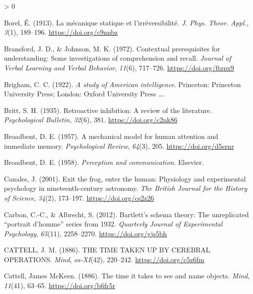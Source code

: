 \documentclass[
  oneside,
  12pt]{crumpbook}
\newlength{\cslhangindent}
\newenvironment{CSLReferences}[2] %
 {%
  \setlength{\parindent}{0pt}
  \ifodd #1 \everypar{\setlength{\hangindent}{\cslhangindent}}\ignorespaces\fi
  \ifnum #2 > 0
  \setlength{\parskip}{#2\baselineskip}
  \fi
 }%
 {}
\begin{document}
\begin{CSLReferences}{1}{0}
\leavevmode\hypertarget{ref-borelMecaniqueStatiqueIrreversibilite1913}{}%
Borel, É. (1913). La mécanique statique et l'irréversibilité. \emph{J. Phys. Theor. Appl.}, \emph{3}(1), 189--196. \url{https://doi.org/c9nnbz}

\leavevmode\hypertarget{ref-bransfordContextualPrerequisitesUnderstanding1972}{}%
Bransford, J. D., \& Johnson, M. K. (1972). Contextual prerequisites for understanding: {Some} investigations of comprehension and recall. \emph{Journal of Verbal Learning and Verbal Behavior}, \emph{11}(6), 717--726. \url{https://doi.org/ftzpx9}

\leavevmode\hypertarget{ref-brighamStudyAmericanIntelligence1922}{}%
Brigham, C. C. (1922). \emph{A study of {American} intelligence}. {Princeton: Princeton University Press; London: Oxford University Press \ldots{}}.

\leavevmode\hypertarget{ref-brittRetroactiveInhibitionReview1935}{}%
Britt, S. H. (1935). Retroactive inhibition: A review of the literature. \emph{Psychological Bulletin}, \emph{32}(6), 381. \url{https://doi.org/c2nk86}

\leavevmode\hypertarget{ref-broadbentMechanicalModelHuman1957}{}%
Broadbent, D. E. (1957). A mechanical model for human attention and immediate memory. \emph{Psychological Review}, \emph{64}(3), 205. \url{https://doi.org/d5srnr}

\leavevmode\hypertarget{ref-broadbentPerceptionCommunication1958}{}%
Broadbent, D. E. (1958). \emph{Perception and communication}. {Elsevier}.

\leavevmode\hypertarget{ref-canalesExitFrogEnter2001}{}%
Canales, J. (2001). Exit the frog, enter the human: Physiology and experimental psychology in nineteenth-century astronomy. \emph{The British Journal for the History of Science}, \emph{34}(2), 173--197. \url{https://doi.org/cs2z26}

\leavevmode\hypertarget{ref-carbonBartlettSchemaTheory2012}{}%
Carbon, C.-C., \& Albrecht, S. (2012). Bartlett's schema theory: {The} unreplicated {``portrait d'homme''} series from 1932. \emph{Quarterly Journal of Experimental Psychology}, \emph{65}(11), 2258--2270. \url{https://doi.org/gjs5bh}

\leavevmode\hypertarget{ref-cattellTIMETAKENCEREBRAL1886}{}%
CATTELL, J. M. (1886). {THE TIME TAKEN UP BY CEREBRAL OPERATIONS}. \emph{Mind}, \emph{os-XI}(42), 220--242. \url{https://doi.org/c5z6fm}

\leavevmode\hypertarget{ref-cattellTimeItTakes1886}{}%
Cattell, James McKeen. (1886). The time it takes to see and name objects. \emph{Mind}, \emph{11}(41), 63--65. \url{https://doi.org/b6fr5r}


\end{CSLReferences}
\end{document}
